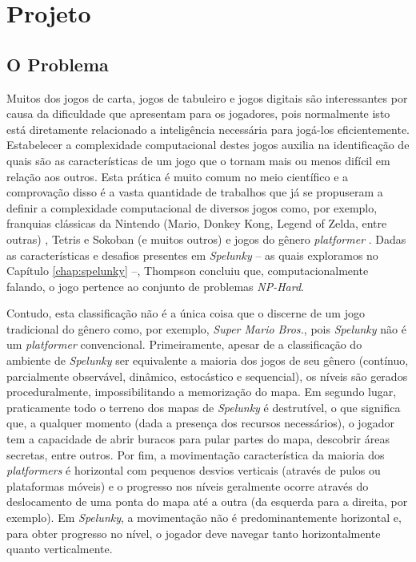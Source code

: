 \chapter{\label{chap:project}Projeto}



\section{\label{section:problem}O Problema}
Muitos dos jogos de carta, jogos de tabuleiro e jogos digitais são interessantes
por causa da dificuldade que apresentam para os jogadores, pois normalmente isto
está diretamente relacionado a inteligência necessária para jogá-los
eficientemente.  Estabelecer a complexidade computacional destes jogos auxilia
na identificação de quais são as características de um jogo que o tornam mais ou
menos difícil em relação aos outros. Esta prática é muito comum no meio
científico e a comprovação disso é a vasta quantidade de trabalhos que já se
propuseram a definir a complexidade computacional de diversos jogos como, por
exemplo, franquias clássicas da Nintendo (Mario, Donkey Kong, Legend of Zelda,
entre outras) \cite{classic_nintendo_games_hard}, Tetris e Sokoban (e muitos
outros) \cite{playing_games_algorithms} e jogos do gênero \textit{platformer}
\cite{computational_complexity_platformers}. Dadas as características e desafios
presentes em \textit{Spelunky} -- as quais exploramos no Capítulo
\ref{chap:spelunky} --, Thompson \cite{SPELUNKYHARD} concluiu que,
computacionalmente falando, o jogo pertence ao conjunto de problemas
\textit{NP-Hard}.

Contudo, esta classificação não é a única coisa que o discerne de um jogo
tradicional do gênero como, por exemplo, \textit{Super Mario Bros.}, pois
\textit{Spelunky} não é um \textit{platformer} convencional. Primeiramente,
apesar de a classificação do ambiente de \textit{Spelunky} ser equivalente a
maioria dos jogos de seu gênero (contínuo, parcialmente observável, dinâmico,
estocástico e sequencial), os níveis são gerados proceduralmente,
impossibilitando a memorização do mapa. Em segundo lugar, praticamente todo o
terreno dos mapas de \textit{Spelunky} é destrutível, o que significa que, a
qualquer momento (dada a presença dos recursos necessários), o jogador tem a
capacidade de abrir buracos para pular partes do mapa, descobrir áreas secretas,
entre outros. Por fim, a movimentação característica da maioria dos
\textit{platformers} é horizontal com pequenos desvios verticais (através de
pulos ou plataformas móveis) e o progresso nos níveis geralmente ocorre através
do deslocamento de uma ponta do mapa até a outra (da esquerda para a direita,
por exemplo). Em \textit{Spelunky}, a movimentação não é predominantemente
horizontal e, para obter progresso no nível, o jogador deve navegar tanto
horizontalmente quanto verticalmente.

